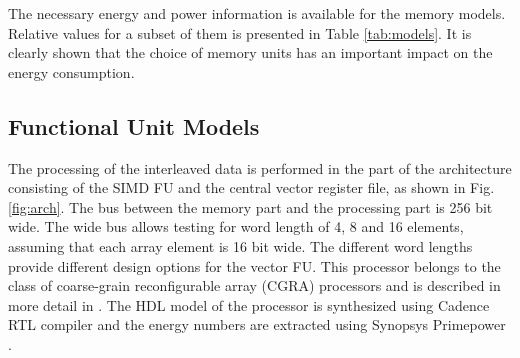\documentclass[prodmode,acmtecs]{acmsmall}
\begin{document}
The necessary energy and power information is available for the memory models. Relative values for a subset of them is presented in Table \ref{tab:models}. 
It is clearly shown that the choice of memory units has an important impact on the energy consumption.

\begin{table}
\begin{tabnote}%
\end{tabnote}%
\end{table}

\subsection{Functional Unit Models}

The processing of the interleaved data is performed in the part of the architecture consisting of the SIMD FU and the central vector register file, as shown in Fig.\ref{fig:arch}.
 The bus between the memory part and the processing part is  256 bit wide.
 The wide bus allows testing for word length of 4, 8 and 16 elements, assuming that each array element is 16 bit wide.
 The different word lengths provide different design options for the vector FU.
This processor belongs to the class of coarse-grain reconfigurable array (CGRA) processors and is described in more detail in \cite{lee2003compilation}.
The HDL model of the processor is synthesized using Cadence RTL compiler \cite{cadencecompiler} and the energy numbers are extracted using Synopsys Primepower \cite{kai2003synopsys}.
\end{document}
